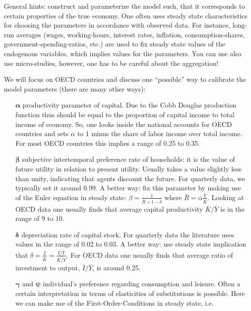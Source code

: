 \begin{Solution}{5}
 General hints: construct and parameterize the model such, that it corresponds to certain properties of the true economy. One often uses steady state characteristics for choosing the parameters in accordance with observed data. For instance, long-run averages (wages, working-hours, interest rates, inflation, consumption-shares, government-spending-ratios, etc.) are used to fix steady state values of the endogenous variables, which implies values for the parameters. You can use also use micro-studies, however, one has to be careful about the aggregation!

		We will focus on OECD countries and discuss one \enquote{possible} way to calibrate the model parameters (there are many other ways):
		\begin{itemize}
			\item[$\boldsymbol{\alpha}$] productivity parameter of capital. Due to the Cobb Douglas production function thus should be equal to the proportion of capital income to total income of economy. So, one looks inside the national accounts for OECD countries and sets $\alpha$ to 1 minus the share of labor income over total income. For most OECD countries this implies a range of 0.25 to 0.35.
			\item[$\boldsymbol{\beta}$] subjective intertemporal preference rate of households: it is the value of future utility in relation to present utility. Usually takes a value slightly less than unity, indicating that agents discount the future. For quarterly data, we typically set it around 0.99. A better way: fix this parameter by making use of the Euler equation in steady state: $\beta = \frac{1}{\bar{R}+1-\delta}$ where $\bar{R}=\alpha \frac{\bar{Y}}{\bar{K}}$. Looking at OECD data one usually finds that average capital productivity $\bar{K}/\bar{Y}$ is in the range of $9$ to $10$.
			\item[$\boldsymbol{\delta}$] depreciation rate of capital stock. For quarterly data the literature uses values in the range of 0.02 to 0.03. A better way: use steady state implication that $\delta=\frac{\bar{I}}{\bar{K}}=\frac{\bar{I/Y}}{\bar{K/Y}}$. For OECD data one usually finds that average ratio of investment to output, $\bar{I}/\bar{Y}$, is around 0.25.
			\item[$\boldsymbol{\gamma}$ and $\boldsymbol{\psi}$] individual's preference regarding consumption and leisure. Often a certain interpretation in terms of elasticities of substitutions is possible. Here we can make use of the First-Order-Conditions in steady state, i.e.

\end{itemize}
\end{Solution}
